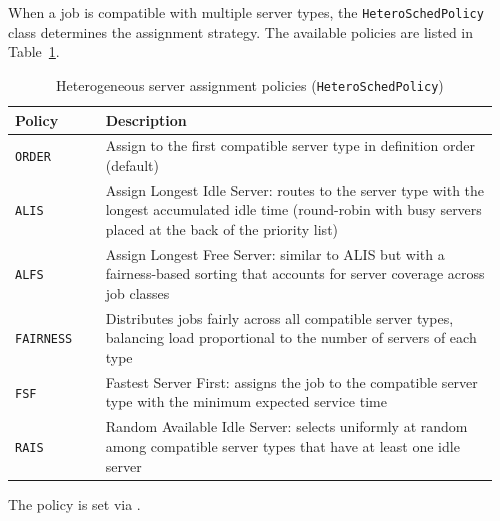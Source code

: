 When a job is compatible with multiple server types, the \texttt{HeteroSchedPolicy} class determines the assignment strategy. The available policies are listed in Table~\ref{tab:heteroschedpolicy}.
\begin{table}[ht!]
\renewcommand{\arraystretch}{1.2}
\centering
\caption{Heterogeneous server assignment policies (\texttt{HeteroSchedPolicy})}
\label{tab:heteroschedpolicy}
{\small
\begin{tabular}{|p{0.18\linewidth}|p{0.78\linewidth}|}
\hline
\textbf{Policy} & \textbf{Description} \\
\hline
\texttt{ORDER} & Assign to the first compatible server type in definition order (default) \\
\hline
\texttt{ALIS} & Assign Longest Idle Server: routes to the server type with the longest accumulated idle time (round-robin with busy servers placed at the back of the priority list) \\
\hline
\texttt{ALFS} & Assign Longest Free Server: similar to ALIS but with a fairness-based sorting that accounts for server coverage across job classes \\
\hline
\texttt{FAIRNESS} & Distributes jobs fairly across all compatible server types, balancing load proportional to the number of servers of each type \\
\hline
\texttt{FSF} & Fastest Server First: assigns the job to the compatible server type with the minimum expected service time \\
\hline
\texttt{RAIS} & Random Available Idle Server: selects uniformly at random among compatible server types that have at least one idle server \\
\hline
\end{tabular}}
\end{table}
The policy is set via .

